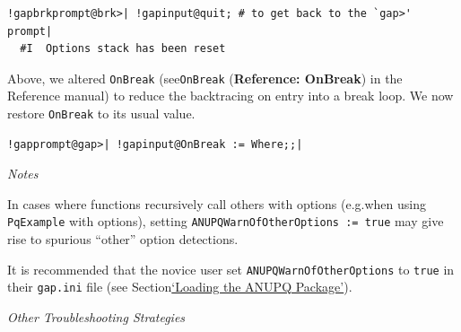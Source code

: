 \documentclass[a4paper,11pt]{report}
\begin{document}
{{{\begin{Verbatim}[commandchars=!@|,fontsize=\small,frame=single,label=Example]
  !gapbrkprompt@brk>| !gapinput@quit; # to get back to the `gap>' prompt|
  #I  Options stack has been reset
\end{Verbatim}
 Above, we altered \texttt{OnBreak} (see{\nobreakspace}\texttt{OnBreak} (\textbf{Reference: OnBreak}) in the Reference manual) to reduce the back\texttt{}tracing on
entry into a break loop. We now restore \texttt{OnBreak} to its usual value. 
\begin{Verbatim}[commandchars=!@|,fontsize=\small,frame=single,label=Example]
  !gapprompt@gap>| !gapinput@OnBreak := Where;;|
\end{Verbatim}
 \emph{Notes} 

 In cases where functions recursively call others with options
(e.g.{\nobreakspace}when using \texttt{PqExample} with options), setting \texttt{ANUPQWarnOfOtherOptions := true} may give rise to spurious ``other'' option detections. 

 It is recommended that the novice user set \texttt{ANUPQWarnOfOtherOptions} to \texttt{true} in their \texttt{gap.ini} file (see Section{\nobreakspace}\hyperref[Loading the ANUPQ Package]{`Loading the ANUPQ Package'}). }

 \emph{Other Troubleshooting Strategies} 

}}
\end{document}
